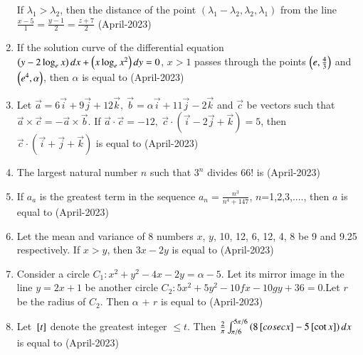 \documentclass[journal]{IEEEtran}
\numberwithin{equation}{enumi}
\numberwithin{figure}{enumi}
\begin{document}
\begin{enumerate}[start=16]
If $\lambda_1 > \lambda_2$, then the distance of the point $(\lambda_1 - \lambda_2, \lambda_2, \lambda_1)$ 
from the line $\frac{x - 5}{1} = \frac{y - 1}{2} = \frac{z + 7}{2}$
\hfill(April-2023)
\item If the solution curve of the differential equation $\left(y - 2 \log_e x\right)dx + \left(x \log_e x^2\right)dy = 0$, $x > 1$ passes through the points $\left(e, \frac{4}{3}\right)$ and  $\left(e^4, \alpha\right)$, then $\alpha$ is equal to 
\hfill(April-2023)
\item Let \(\vec{a} = 6\vec{i} + 9\vec{j} + 12\vec{k}, \ \vec{b} = \alpha\vec{i} + 11\vec{j} - 2\vec{k}\) and \(\vec{c}\) be vectors such that \(\vec{a} \times \vec{c} = -\vec{a} \times \vec{b}\). If \(\vec{a} \cdot \vec{c} = -12, \ \vec{c} \cdot (\vec{i} - 2\vec{j} + \vec{k}) = 5\), then \(\vec{c} \cdot (\vec{i} + \vec{j} + \vec{k})\) is equal to 
\hfill(April-2023)
\item The largest natural number $n$ such that $3^n$ divides 66! is
\hfill(April-2023)
\item If $a_a$ is the greatest term in the sequence $a_n=\frac{n^3}{n^4 + 147}$, $n$=1,2,3,...., then $a$ is equal to 
\hfill(April-2023)
\item Let the mean and variance of 8 numbers $x$, $y$, 10, 12, 6, 12, 4, 8 be 9 and 9.25 respectively. If $x>y$, then $3x-2y$ is equal to 
\hfill(April-2023)
\item Consider a circle $C_1 : x^2+y^2-4x-2y=\alpha-5$. Let its mirror  image in the line $y=2x+1$ be another circle $C_2 : 5x^2+5y^2 -10fx-10gy+36=0 $.Let $r$ be the radius of $C_2$. Then $\alpha$ + $r$ is equal to
\hfill(April-2023)
\item Let ${}\left[t\right]$ denote the greatest integer $\leq t$. Then $\frac{2}{\pi} \int_{\pi/6}^{5\pi/6} \left(8{}\left[cosec x\right] - 5{}\left[\cot x\right] \right) dx$ is equal to 
\hfill(April-2023)






\end{enumerate}
\end{document}

